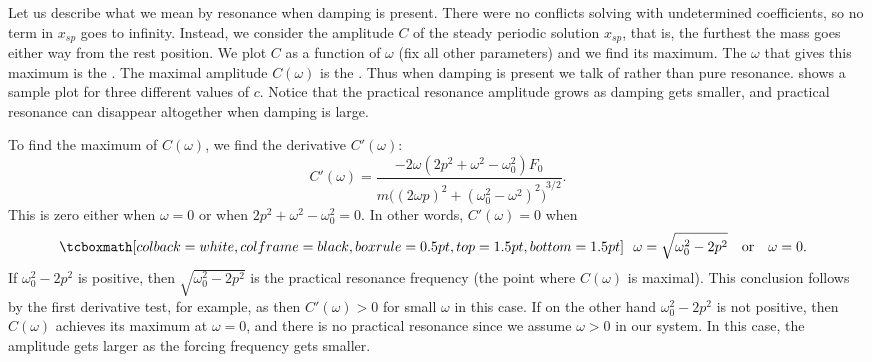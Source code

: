 Let us describe what we mean by resonance when damping is present.
There were no conflicts solving with undetermined coefficients,
so
no term in $x_{sp}$ goes to infinity.  Instead, we consider the
amplitude $C$ of the steady periodic solution $x_{sp}$,
that is, the furthest the
mass goes either way from the rest
position.
We plot $C$
as a function of $\omega$ (fix all other
parameters) and we find its maximum.
The $\omega$ that gives this maximum
is the \emph{}.
The maximal amplitude $C(\omega)$ is
the \emph{}.
Thus when damping is present we talk of \emph{}
rather than pure resonance.
 shows a
sample plot for three different
values of $c$.  Notice that the
practical resonance amplitude grows as damping gets smaller, and 
practical resonance can disappear altogether when damping is large.

\begin{myfig}
\capstart
{}
\caption{Graph of $C(\omega)$ showing practical resonance with parameters
$k=1$, $m=1$, $F_0 = 1$. The top line is with $c=0.4$, the middle line with
$c=0.8$, and the bottom line with
$c=1.6$.\label{3.6:pracresfig}}
\end{myfig}

To find the maximum of $C(\omega)$, we find the derivative $C'(\omega)$:
\begin{equation*}
C'(\omega) =
\frac{- 2\omega( 2p^2+\omega^2-\omega_0^2)F_0}
{m {\bigl({(2\omega p)}^2+{(\omega_0^2-\omega^2)}^2\bigr)}^{3/2}} .
\end{equation*}
This is zero either when $\omega = 0$ or when
$2p^2+\omega^2-\omega_0^2 = 0$.  In other words, $C'(\omega) = 0$ when
\begin{equation*}
\mybxbg{
~~
\omega = \sqrt{\omega_0^2 - 2p^2} \quad \text{or} \quad \omega = 0 .
~~
}
\end{equation*}
If $\omega_0^2 - 2p^2$ is positive, then
$\sqrt{\omega_0^2 - 2p^2}$ is the practical resonance frequency (the
point where $C(\omega)$ is maximal).  This conclusion follows by the first derivative
test, for example, as then $C'(\omega) > 0$ for small $\omega$ in this case.
If on the other hand $\omega_0^2 - 2p^2$ is not positive, then
$C(\omega)$ achieves its maximum at
$\omega=0$, and
there is no practical resonance since we assume $\omega > 0$
in our system.  In this case, the amplitude gets larger as the forcing
frequency gets smaller.

